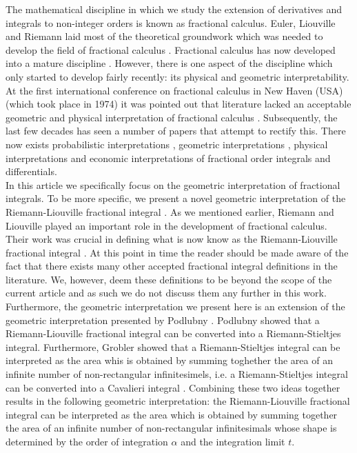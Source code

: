 \documentclass{article}
\theoremstyle{theorem}
\theoremstyle{definition}
\begin{document}
\noindent
The mathematical discipline in which we study the extension of derivatives and integrals to non-integer orders is known as fractional calculus. Euler, Liouville and Riemann laid most 
of the theoretical groundwork which was needed to develop the field of fractional calculus \cite{davis59,euler1738,liouville1832,riemann1876,laurent1884}. Fractional calculus has now developed into a mature discipline \cite{machado14}. 
However, there is one aspect of the discipline which only started to develop fairly recently: its physical and geometric interpretability. At the first international conference on fractional calculus in
New Haven (USA) (which took place in 1974) it was pointed out that literature lacked an acceptable geometric and physical interpretation of fractional calculus \cite{ross06}. Subsequently, the last few decades has seen 
a number of papers that attempt to rectify this. There now exists probabilistic interpretations \cite{stanislavsky04,machado03}, geometric interpretations \cite{adda97,tarasov16,podlubny02}, physical interpretations \cite{cioc16,rutman95} and economic 
interpretations \cite{tarasova17} of fractional order integrals and differentials.\\

\noindent
In this article we specifically focus on the geometric interpretation of fractional integrals. To be more specific, we present a novel geometric interpretation of the Riemann-Liouville fractional integral \cite{laurent1884}.
As we mentioned earlier, Riemann and Liouville played an important role in the development of fractional calculus. Their work was crucial in defining what is now know as 
the Riemann-Liouville fractional integral \cite{laurent1884}. At this point in time the reader should be made aware of the fact that there exists many other accepted fractional integral definitions in the literature.
We, however, deem these definitions to be beyond the scope of the current article and as such we do not discuss them any further in this work. Furthermore, the geometric interpretation 
we present here is an extension of the geometric interpretation presented by Podlubny \cite{podlubny02}. Podlubny showed that a Riemann-Liouville fractional integral 
can be converted into a Riemann-Stieltjes integral. Furthermore, Grobler showed that a Riemann-Stieltjes integral can be interpreted as the area whis is obtained by summing toghether 
the area of an infinite number of non-rectangular infinitesimels, i.e. a Riemann-Stieltjes integral can be converted into a Cavalieri integral \cite{ackermann12,grobler19}. Combining these two ideas together results in the following geometric 
interpretation: the Riemann-Liouville fractional integral can be interpreted as the area which is obtained by summing together the area of an infinite number of non-rectangular infinitesimals whose shape is determined by the order of integration $\alpha$ and the integration limit $t$.\\
\end{document}
